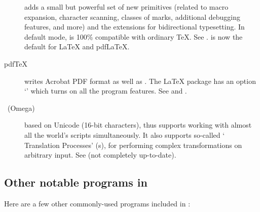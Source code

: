 \documentclass{article}
\begin{document}
\begin{description}

\item [\eTeX] adds a small but powerful set of new primitives
\label{text:etex}
(related to macro expansion, character scanning, classes of marks,
additional debugging features, and more) and the \TeXXeT{} extensions
for bidirectional typesetting.  In default mode, \eTeX{} is 100\%
compatible with ordinary \TeX. See
.  \eTeX{} is now the default for
\LaTeX{} and pdf\LaTeX{}.

\item [pdf\TeX] writes Acrobat PDF format as well as \dvi{}. The
\LaTeX{}  package has an option `'
which turns on all the program features.  See
 and
.

\item [\OMEGA\ (Omega)] based on Unicode (16-bit characters), thus
supports working with almost all the world's scripts simultaneously. It
also supports so-called `\OMEGA{} Translation Processes' (s),
for performing complex transformations on arbitrary input. See
 (not completely up-to-date).

\end{description} 


\subsection{Other notable programs in \protect\TeXLive}

Here are a few other commonly-used programs included in \TeXLive{}:
\end{document}
